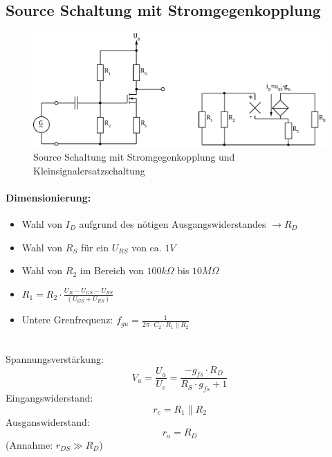 



\subsection{Source Schaltung mit Stromgegenkopplung}
\begin{figure}[h!]
	\centering
	\includegraphics[width = \linewidth]{fet_source_i.pdf}
	\caption{Source Schaltung mit Stromgegenkopplung und Kleinsignalersatzschaltung}
	\label{fet:sourceschaltung_i}
\end{figure}
\noindent
\paragraph{Dimensionierung:}
\begin{itemize}
	\item Wahl von $I_D$ aufgrund des nötigen Ausgangswiderstandes $\rightarrow R_D$
	\item Wahl von $R_S$ für ein $U_{RS}$ von ca. $1V$
	\item Wahl von $R_2$ im Bereich von $100k\Omega$ bis $10M\Omega$
	\item $R_1 = R_2 \cdot \frac{U_B - U_{GS} - U_{RS}}{(U_{GS}+U_{RS})}$
	\item Untere Grenfrequenz: $f_{gu} = \frac{1}{2\pi \cdot C_2 \cdot R_1 \parallel R_2}$
\end{itemize}
\noindent\\
Spannungsverstärkung:
\[
	V_u = \frac{U_a}{U_e} = \frac{-g_{fs} \cdot R_D}{R_S \cdot g_{fs} + 1}
\]
Eingangswiderstand:
\[
	r_e = R_1 \parallel R_2
\]
Ausganswiderstand:
\[
	r_a = R_D
\]
(Annahme: $r_{DS} \gg R_D$)